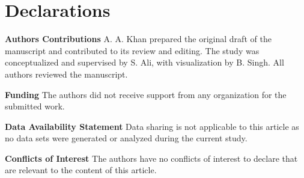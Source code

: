 \documentclass[12pt]{article}
\begin{document}
\section{\bf Declarations}

 \noindent \textbf{Authors Contributions}\newline 
A. A. Khan prepared the original draft of the manuscript and contributed to its review and editing. The study was conceptualized and supervised by S. Ali, with visualization by B. Singh. All authors reviewed the manuscript.\newline
 
\noindent \textbf{Funding}\newline
The authors did not receive support from any organization for the submitted work.\newline


\noindent \textbf{Data Availability Statement}\newline
Data sharing is not applicable to this article as no data sets were
generated or analyzed during the current study.\newline

\noindent \textbf{Conflicts of Interest}\newline
The authors have no conflicts of interest to declare that are relevant to the content of this article. \newline
\end{document}
